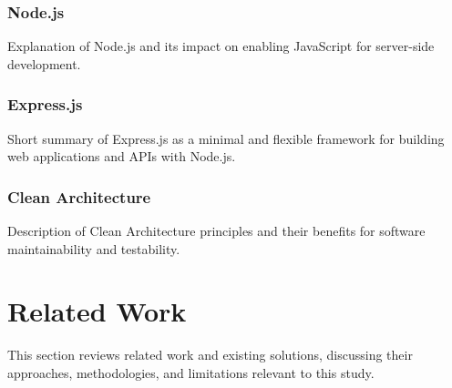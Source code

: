 \subsubsection{Node.js}
Explanation of Node.js and its impact on enabling JavaScript for server-side development.

\subsubsection{Express.js}
Short summary of Express.js as a minimal and flexible framework for building web applications and APIs with Node.js.

\subsubsection{Clean Architecture}
Description of Clean Architecture principles and their benefits for software maintainability and testability.

\section{Related Work}
This section reviews related work and existing solutions, discussing their approaches, methodologies, and limitations relevant to this study.
